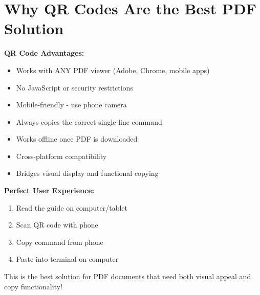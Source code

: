 \documentclass{article}
\begin{document}
\section{Why QR Codes Are the Best PDF Solution}

\begin{infobox}
\textbf{QR Code Advantages:}
\begin{itemize}
    \item Works with ANY PDF viewer (Adobe, Chrome, mobile apps)
    \item No JavaScript or security restrictions
    \item Mobile-friendly - use phone camera
    \item Always copies the correct single-line command
    \item Works offline once PDF is downloaded
    \item Cross-platform compatibility
    \item Bridges visual display and functional copying
\end{itemize}

\textbf{Perfect User Experience:}
\begin{enumerate}
    \item Read the guide on computer/tablet
    \item Scan QR code with phone
    \item Copy command from phone
    \item Paste into terminal on computer
\end{enumerate}

This is the best solution for PDF documents that need both visual appeal and copy functionality!
\end{infobox}
\end{document}
